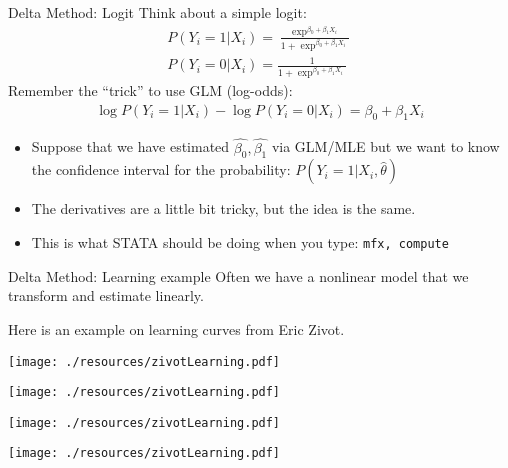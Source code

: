 \begin{frame}{Delta Method: Logit}
  Think about a simple logit:
  \begin{eqnarray*}
  P(Y_i=1 | X_i ) = \frac{\exp^{\beta_0 + \beta_1 X_i}}{1+\exp^{\beta_0 + \beta_1 X_i}} \\
  P(Y_i=0 | X_i ) = \frac{1}{1+\exp^{\beta_0 + \beta_1 X_i}} 
  \end{eqnarray*}
  Remember the ``trick'' to use GLM (log-odds):
  \begin{eqnarray*}
  \log P(Y_i=1 | X_i) - \log P(Y_i=0 | X_i) = \beta_0 + \beta_1 X_i
  \end{eqnarray*}
  \vspace{-10pt}
  \begin{itemize}
  \item Suppose that we have estimated $\hat{\beta_0},\hat{\beta_1}$ via GLM/MLE but we want to know the confidence interval for the probability: $P(Y_i=1 | X_i,\hat{\theta})$
  \item The derivatives are a little bit tricky, but the idea is the same.
  \item This is what STATA should be doing when you type: \tt{mfx, compute}
  \end{itemize}
\end{frame}


\begin{frame}{Delta Method: Learning example}
  Often we have a nonlinear model that we transform and estimate linearly.
   
  Here is an example on learning curves from Eric Zivot. 
  \vspace{-15pt}

  \texttt{[image: ./resources/zivotLearning.pdf]}

\end{frame}

\begin{frame}[plain]{}
	\texttt{[image: ./resources/zivotLearning.pdf]}
\end{frame}

\begin{frame}[plain]{}
	\texttt{[image: ./resources/zivotLearning.pdf]}
\end{frame}

\begin{frame}[plain]{}
	\texttt{[image: ./resources/zivotLearning.pdf]}
\end{frame}

